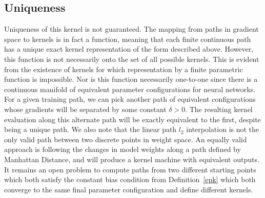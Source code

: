 \subsection{Uniqueness}
Uniqueness of this kernel is not guaranteed. 
The mapping from paths in gradient space to kernels is in fact a function, meaning that each finite continuous path has a unique exact kernel representation of the form described above. 
However, this function is not necessarily onto the set of all possible kernels. 
This is evident from the existence of kernels for which representation by a finite parametric function is impossible.
Nor is this function necessarily one-to-one since there is a continuous manifold of equivalent parameter configurations for neural networks.
For a given training path, we can pick another path of equivalent configurations whose gradients will be separated by some constant $\delta > 0$.
The resulting kernel evaluation along this alternate path will be exactly equivalent to the first, despite being a unique path. 
We also note that the linear path $l_2$ interpolation is not the only valid path between two discrete points in weight space.
An equally valid approach is following the changes in model weights along a path defined by Manhattan Distance, and will produce a kernel machine with equivalent outputs.
It remains an open problem to compute paths from two different starting points which both satisfy the constant bias condition from Definition~\eqref{epk} which both converge to the same final parameter configuration and define different kernels.

